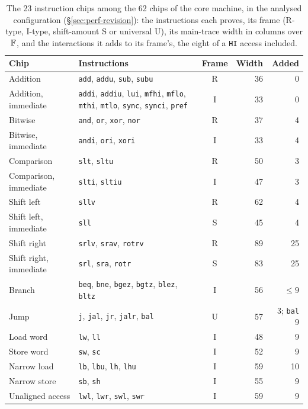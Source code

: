 \begin{table}[!htbp]
\centering
\small
\caption{The 23 instruction chips among the 62 chips of the core machine, in the analysed configuration (\S\ref{sec:perf-revision}): the instructions each proves, its frame (R-type, I-type, shift-amount S or universal U), its main-trace width in columns over $\mathbb{F}$, and the interactions it adds to its frame's, the eight of a \texttt{HI} access included.}
\label{tab:chips}
\begin{tabular}{@{}l>{\raggedright\arraybackslash}p{}crr@{}}
\toprule
Chip & Instructions & Frame & Width & Added \\
\midrule
Addition & \texttt{add}, \texttt{addu}, \texttt{sub}, \texttt{subu} & R & 36 & 0 \\
Addition, immediate & \texttt{addi}, \texttt{addiu}, \texttt{lui}, \texttt{mfhi}, \texttt{mflo}, \texttt{mthi}, \texttt{mtlo}, \texttt{sync}, \texttt{synci}, \texttt{pref} & I & 33 & 0 \\
Bitwise & \texttt{and}, \texttt{or}, \texttt{xor}, \texttt{nor} & R & 37 & 4 \\
Bitwise, immediate & \texttt{andi}, \texttt{ori}, \texttt{xori} & I & 33 & 4 \\
Comparison & \texttt{slt}, \texttt{sltu} & R & 50 & 3 \\
Comparison, immediate & \texttt{slti}, \texttt{sltiu} & I & 47 & 3 \\
Shift left & \texttt{sllv} & R & 62 & 4 \\
Shift left, immediate & \texttt{sll} & S & 45 & 4 \\
Shift right & \texttt{srlv}, \texttt{srav}, \texttt{rotrv} & R & 89 & 25 \\
Shift right, immediate & \texttt{srl}, \texttt{sra}, \texttt{rotr} & S & 83 & 25 \\
Branch & \texttt{beq}, \texttt{bne}, \texttt{bgez}, \texttt{bgtz}, \texttt{blez}, \texttt{bltz} & I & 56 & $\le 9$ \\
Jump & \texttt{j}, \texttt{jal}, \texttt{jr}, \texttt{jalr}, \texttt{bal} & U & 57 & 3; \texttt{bal} 9 \\
Load word & \texttt{lw}, \texttt{ll} & I & 48 & 9 \\
Store word & \texttt{sw}, \texttt{sc} & I & 52 & 9 \\
Narrow load & \texttt{lb}, \texttt{lbu}, \texttt{lh}, \texttt{lhu} & I & 59 & 10 \\
Narrow store & \texttt{sb}, \texttt{sh} & I & 55 & 9 \\
Unaligned access & \texttt{lwl}, \texttt{lwr}, \texttt{swl}, \texttt{swr} & I & 59 & 9 \\

\end{tabular}
\end{table}
